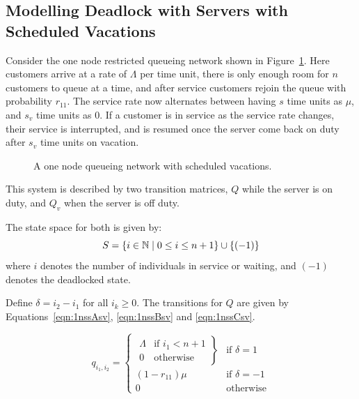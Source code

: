 \documentclass{article}
\begin{document}
\subsection{Modelling Deadlock with Servers with Scheduled Vacations}

Consider the one node restricted queueing network shown in Figure~\ref{fig:1nodescheduledvacations}.
Here customers arrive at a rate of $\Lambda$ per time unit, there is only enough room for $n$ customers to queue at a time, and after service customers rejoin the queue with probability $r_{11}$.
The service rate now alternates between having $s$ time units as $\mu$, and $s_v$ time units as $0$.
If a customer is in service as the service rate changes, their service is interrupted, and is resumed once the server come back on duty after $s_v$ time units on vacation.

\begin{figure}[!hbtp]
    \begin{center}
        
    \end{center}
    \caption{A one node queueing network with scheduled vacations.}
    \label{fig:1nodescheduledvacations}
\end{figure}

This system is described by two transition matrices, $Q$ while the server is on duty, and $Q_v$ when the server is off duty.

The state space for both is given by:
        \[S = \{i\in\mathbb{N} \nonscript\; | \nonscript\; 0 \leq i \leq n + 1
        \}\cup\{(-1)\}\]
where \(i\) denotes the number of individuals in service or waiting, and $(-1)$ denotes the deadlocked state.

Define $\delta = i_2 - i_1$ for all $i_k \geq 0$.
The transitions for $Q$ are given by Equations~\ref{eqn:1nssAsv}, \ref{eqn:1nssBsv} and \ref{eqn:1nssCsv}.

\begin{equation}\label{eqn:1nssAsv}
  q_{i_1, i_2} = \left\{
  \begin{array}{rr}
    \left. \begin{array}{rr}
      \Lambda & \text{if } i_1 < n + 1 \\
      0 & \text{otherwise}
    \end{array} \right\} & \text{if } \delta = 1 \\
    (1 - r_{11})\mu & \text{if } \delta = -1 \\
    0 & \text{otherwise}
  \end{array} \right.
\end{equation}
\end{document}
